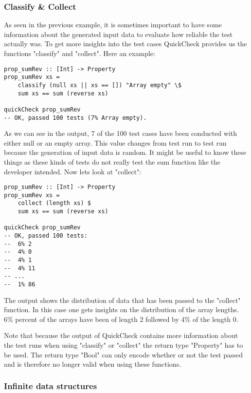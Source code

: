 \documentclass[a4paper, 12pt]{article} %
\begin{document}
\subsubsection{Classify \& Collect}

As seen in the previous example, it is sometimes important to have some information about the generated input data to evaluate how reliable the test actually was. To get more insights into the test cases QuickCheck provides us the functions "classify" and "collect". \cite{Claessen2000} Here an example:

\begin{verbatim}
prop_sumRev :: [Int] -> Property
prop_sumRev xs = 
    classify (null xs || xs == []) "Array empty" \$
    sum xs == sum (reverse xs)

quickCheck prop_sumRev
-- OK, passed 100 tests (7% Array empty).
\end{verbatim}

As we can see in the output, 7 of the 100 test cases have been conducted with either null or an empty array. This value changes from test run to test run because the generation of input data is random. It might be useful to know these things as these kinds of tests do not really test the sum function like the developer intended. Now lets look at "collect":

\begin{verbatim}
prop_sumRev :: [Int] -> Property
prop_sumRev xs = 
    collect (length xs) $
    sum xs == sum (reverse xs)

quickCheck prop_sumRev
-- OK, passed 100 tests:
--  6% 2 
--  4% 0 
--  4% 1 
--  4% 11 
-- ... 
--  1% 86 
\end{verbatim}

The output shows the distribution of data that has been passed to the "collect" function. In this case one gets insights on the distribution of the array lengths. 6\% percent of the arrays have been of length 2 followed by 4\% of the length 0.

Note that because the output of QuickCheck contains more information about the test runs when using "classify" or "collect" the return type "Property" has to be used. The return type "Bool" can only encode whether or not the test passed and is therefore no longer valid when using these functions. 

\subsubsection{Infinite data structures}
\end{document}
